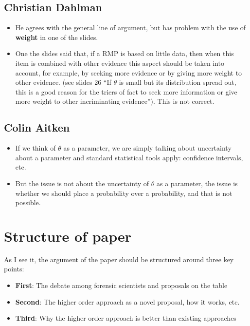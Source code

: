 \documentclass[
  10pt,
  dvipsnames,enabledeprecatedfontcommands]{scrartcl}
\begin{document}
\hypertarget{christian-dahlman}{%
\subsection{Christian Dahlman}\label{christian-dahlman}}

\begin{itemize}
\item
  He agrees with the general line of argument, but has problem with the
  use of \textbf{weight} in one of the slides.
\item
  One the slides said that, if a RMP is based on little data, then when
  this item is combined with other evidence this aspect should be taken
  into account, for example, by seeking more evidence or by giving more
  weight to other evidence. (see slides 26 ``If \(\theta\) is small but
  its distribution spread out, this is a good reason for the triers of
  fact to seek more information or give more weight to other
  incriminating evidence''). This is not correct.
\end{itemize}

\hypertarget{colin-aitken}{%
\subsection{Colin Aitken}\label{colin-aitken}}

\begin{itemize}
\item
  If we think of \(\theta\) as a parameter, we are simply talking about
  uncertainty about a parameter and standard statistical tools apply:
  confidence intervals, etc.
\item
  But the issue is not about the uncertainty of \(\theta\) as a
  parameter, the issue is whether we should place a probability over a
  probability, and that is not possible.
\end{itemize}

\hypertarget{structure-of-paper}{%
\section{Structure of paper}\label{structure-of-paper}}

As I see it, the argument of the paper should be structured around three
key points:

\begin{itemize}
\item
  \textbf{First}: The debate among forensic scientists and proposals on
  the table
\item
  \textbf{Second}: The higher order approach as a novel proposal, how it
  works, etc.
\item
  \textbf{Third}: Why the higher order approach is better than existing
  approaches
\end{itemize}
\end{document}
